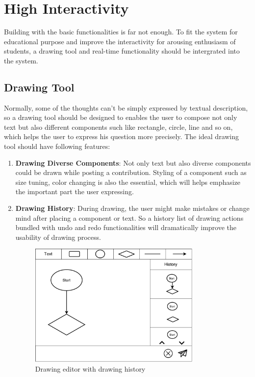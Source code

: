 \begin{enumerate}
\end{enumerate}


\section{High Interactivity}
Building with the basic functionalities is far not enough. To fit the system for educational purpose and improve the interactivity for arousing enthusiasm of students, a drawing tool and real-time functionality should be intergrated into the system.

\subsection{Drawing Tool}
Normally, some of the thoughts can't be simply expressed by textual description, so a drawing tool should be designed to enables the user to compose not only text but also different components such like rectangle, circle, line and so on, which helps the user to express his question more precisely.
The ideal drawing tool should have following features:

\begin{enumerate}
\item
\textbf{Drawing Diverse Components}: Not only text but also diverse components could be drawn while posting a contribution. Styling of a component such as size tuning, color changing is also the essential, which will helps emphasize the important part the user expressing.

\item
\textbf{Drawing History}: During drawing, the user might make mistakes or change mind after placing a component or text. So a history list of drawing actions bundled with undo and redo functionalities will dramatically improve the usability of drawing process.

\begin{figure}[!htbp]
  \centering
    \includegraphics[width=0.8\textwidth]{Figures/mockup/editor.pdf}
  \caption{Drawing editor with drawing history}
\end{figure}


\end{enumerate}


